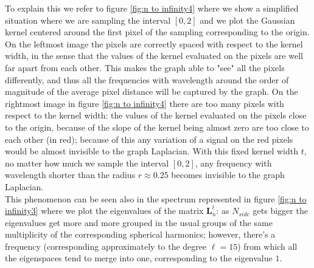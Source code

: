  To explain this we refer to figure \ref{fig:n to infinity4} where we show a simplified situation where we are sampling the interval $[0, 2]$ and we plot the Gaussian kernel centered around the first pixel of the sampling corresponding to the origin. On the leftmost image the pixels are correctly spaced with respect to the kernel width, in the sense that the values of the kernel evaluated on the pixels are well far apart from each other. This makes the graph able to "see" all the pixels differently, and thus all the frequencies with wavelength around the order of magnitude of the average pixel distance will be captured by the graph. On the rightmost image in figure \ref{fig:n to infinity4} there are too many pixels with respect to the kernel width: the values of the kernel evaluated on the pixels close to the origin, because of the slope of the kernel being almost zero are too close to each other (in red); because of this any variation of a signal on the red pixels would be almost invisible to the graph Laplacian. With this fixed kernel width $t$, no matter how much we sample the interval $[0,2]$, any frequency with wavelength shorter than the radius $r\approx0.25$ becomes invisible to the graph Laplacian.\\
 This phenomenon can be seen also in the spectrum represented in figure \ref{fig:n to infinity3} where we plot the eigenvalues of the matrix $\mathbf L_n^t$: as $N_{side}$ gets bigger the eigenvalues get more and more grouped in the usual groups of the same multiplicity of the corresponding spherical harmonics; however, there's a frequency (corresponding approximately to the degree $\ell=15$) from which all the eigenspaces tend to merge into one, corresponding to the eigenvalue $1$.
 
